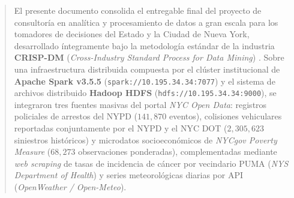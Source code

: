 \documentclass[11pt,a4paper]{article}
\begin{document}

\begin{abstract}
\noindent El presente documento consolida el entregable final del proyecto de consultoría en analítica y procesamiento de datos a gran escala para los tomadores de decisiones del Estado y la Ciudad de Nueva York, desarrollado íntegramente bajo la metodología estándar de la industria \textbf{CRISP-DM} (\textit{Cross-Industry Standard Process for Data Mining}) \cite{crisp_dm_2000}. Sobre una infraestructura distribuida compuesta por el clúster institucional de \textbf{Apache Spark v3.5.5} (\texttt{spark://10.195.34.34:7077}) y el sistema de archivos distribuido \textbf{Hadoop HDFS} (\texttt{hdfs://10.195.34.34:9000}), se integraron tres fuentes masivas del portal \textit{NYC Open Data}: registros policiales de arrestos del NYPD ($141,870$ eventos), colisiones vehiculares reportadas conjuntamente por el NYPD y el NYC DOT ($2,305,623$ siniestros históricos) y microdatos socioeconómicos de \textit{NYCgov Poverty Measure} ($68,273$ observaciones ponderadas), complementadas mediante \textit{web scraping} de tasas de incidencia de cáncer por vecindario PUMA (\textit{NYS Department of Health}) y series meteorológicas diarias por API (\textit{OpenWeather / Open-Meteo}).


\end{abstract}
\end{document}
